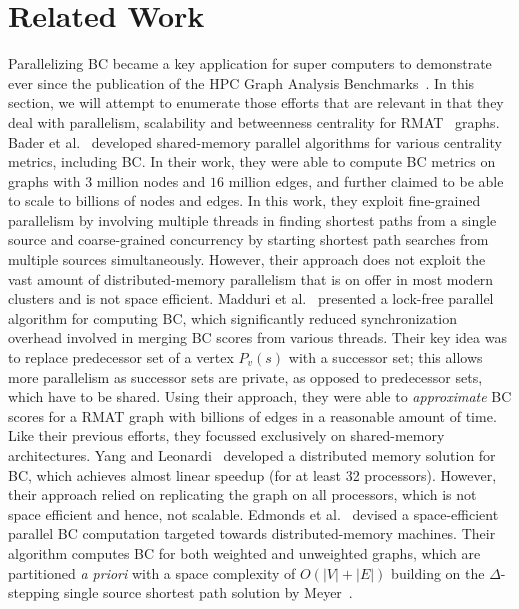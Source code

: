 \section{Related Work}
\label{sec:related}
%
Parallelizing BC became a key application for super computers to demonstrate
ever since the publication of the HPC Graph Analysis
Benchmarks~\cite{ssca_matlab}.
%
In this section, we will attempt to enumerate those efforts that are relevant
in that they deal with parallelism, scalability and betweenness centrality for
RMAT~\cite{Chakrabarti04:Recursive} graphs.
%
Bader et al.~\cite{Bader06:centrality} developed shared-memory parallel 
algorithms for various centrality metrics, including BC. 
%
In their work, they were able to compute BC metrics on graphs with $3$ million
nodes and $16$ million edges, and further claimed to be able to scale to
billions of nodes and edges.
%
In this work, they exploit fine-grained parallelism by involving multiple 
threads in finding shortest paths from a single source and coarse-grained
concurrency by starting shortest path searches from multiple sources 
simultaneously.
%
However, their approach does not exploit the vast amount of distributed-memory
parallelism that is on offer in most modern clusters and is not space
efficient.
%
Madduri et al.~\cite{Madduri:2009} presented a lock-free parallel algorithm for
computing BC, which significantly reduced synchronization overhead involved in
merging BC scores from various threads.
%
Their key idea was to replace predecessor set of a vertex $P_v(s)$ with a
successor set; this allows more parallelism as successor sets are private, as
opposed to predecessor sets, which have to be shared.
%
Using their approach, they were able to \textit{approximate} BC scores for a 
RMAT graph with billions of edges in a reasonable amount of time.
%
Like their previous efforts, they focussed exclusively on shared-memory
architectures.
%
Yang and Leonardi~\cite{Yang05} developed a distributed memory solution for 
BC, which achieves almost linear speedup (for at least 32 processors).
%
However, their approach relied on replicating the graph on all processors,
which is not space efficient and hence, not scalable.
%
Edmonds et al.~\cite{edmonds-hipc-2010} devised a space-efficient parallel 
BC computation targeted towards distributed-memory machines.
%
Their algorithm computes BC for both weighted and unweighted graphs, which are
partitioned \textit{a priori} with a space complexity of
$O(\lvert{}V\rvert{}+\lvert{}E\rvert{})$ building on the $\Delta{}$-stepping
single source shortest path solution by Meyer~\cite{Meyer03:DeltaStepping}.





